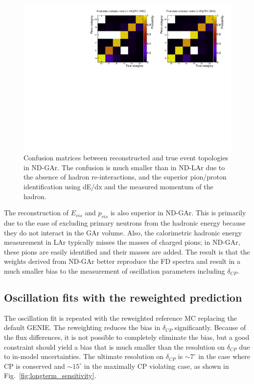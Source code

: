 \documentclass[11pt]{article}
\begin{document}
\begin{figure}[h]
\centering
\includegraphics[width=0.9\columnwidth]{graphics/PiStudyConfusionMatrixBoth.pdf}
\caption{Confusion matrices between reconstructed and true event topologies in ND-GAr. The confusion is much smaller than in ND-LAr due to the absence of hadron re-interactions, and the superior pion/proton identification using dE/dx and the measured momentum of the hadron.}
\label{fig:gar_matrices}
\end{figure}

The reconstruction of $E_{vis}$ and $p_{vis}$ is also superior in ND-GAr. This is primarily due to the ease of excluding primary neutrons from the hadronic energy because they do not interact in the GAr volume. Also, the calorimetric hadronic energy measurement in LAr typically misses the masses of charged pions; in ND-GAr, these pions are easily identified and their masses are added. The result is that the weights derived from ND-GAr better reproduce the FD spectra and result in a much smaller bias to the measurement of oscillation parameters including $\delta_{CP}$.

\subsection{Oscillation fits with the reweighted prediction}

The oscillation fit is repeated with the reweighted reference MC replacing the default GENIE. The reweighting reduces the bias in $\delta_{CP}$ significantly. Because of the flux differences, it is not possible to completely eliminate the bias, but a good constraint should yield a bias that is much smaller than the resolution on $\delta_{CP}$ due to in-model uncertainties. The ultimate resolution on $\delta_{CP}$ is $\sim 7^{\circ}$ in the case where CP is conserved and $\sim 15^{\circ}$ in the maximally CP violating case, as shown in Fig.~\ref{fig:longterm_sensitivity}. 
\end{document}
